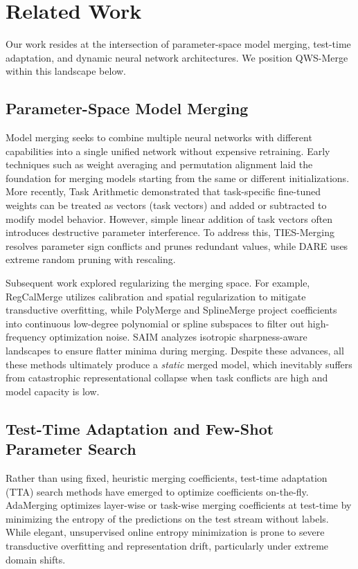 \section{Related Work}
\label{sec:related_work}

Our work resides at the intersection of parameter-space model merging, test-time adaptation, and dynamic neural network architectures. We position QWS-Merge within this landscape below.

\subsection{Parameter-Space Model Merging}
Model merging seeks to combine multiple neural networks with different capabilities into a single unified network without expensive retraining. Early techniques such as weight averaging \cite{frankle2020linear} and permutation alignment \cite{singh2020model, gitrebasin} laid the foundation for merging models starting from the same or different initializations. More recently, Task Arithmetic \cite{ilharco2022editing} demonstrated that task-specific fine-tuned weights can be treated as vectors (task vectors) and added or subtracted to modify model behavior. However, simple linear addition of task vectors often introduces destructive parameter interference. To address this, TIES-Merging \cite{yadav2023ties} resolves parameter sign conflicts and prunes redundant values, while DARE \cite{yu2023language} uses extreme random pruning with rescaling. 

Subsequent work explored regularizing the merging space. For example, RegCalMerge \cite{regcalmerge} utilizes calibration and spatial regularization to mitigate transductive overfitting, while PolyMerge and SplineMerge \cite{polymerge} project coefficients into continuous low-degree polynomial or spline subspaces to filter out high-frequency optimization noise. SAIM \cite{saim} analyzes isotropic sharpness-aware landscapes to ensure flatter minima during merging. Despite these advances, all these methods ultimately produce a \emph{static} merged model, which inevitably suffers from catastrophic representational collapse when task conflicts are high and model capacity is low.

\subsection{Test-Time Adaptation and Few-Shot Parameter Search}
Rather than using fixed, heuristic merging coefficients, test-time adaptation (TTA) search methods have emerged to optimize coefficients on-the-fly. AdaMerging \cite{liang2023adamerging} optimizes layer-wise or task-wise merging coefficients at test-time by minimizing the entropy of the predictions on the test stream without labels. While elegant, unsupervised online entropy minimization is prone to severe transductive overfitting and representation drift, particularly under extreme domain shifts. 

